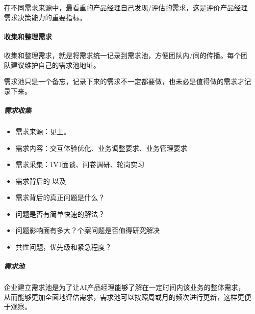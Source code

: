 \documentclass[letterpaper,11pt,english]{sphinxmanual}
\begin{document}
在不同需求来源中，最看重的产品经理自己发现/评估的需求，这是评价产品经理需求决策能力的重要指标。


\paragraph{收集和整理需求}
\label{\detokenize{chapter_knowledge/upgrade_manage:id11}}
收集和整理需求，就是将需求统一记录到需求池，方便团队内/间的传播。每个团队建议维护自己的需求池地址。

需求池只是一个备忘，记录下来的需求不一定都要做，也未必是值得做的需求才记录下来。


\subparagraph{需求收集}
\label{\detokenize{chapter_knowledge/upgrade_manage:id12}}\begin{itemize}
\item {} 
需求来源：见上。

\item {} 
需求内容：交互体验优化、业务调整要求、业务管理要求

\item {} 
需求采集：1V1面谈、问卷调研、轮岗实习

\item {} 
需求背后的  以及 

\item {} 
需求背后的真正问题是什么？

\item {} 
问题是否有简单快速的解法？

\item {} 
问题影响面有多大？个案问题是否值得研究解决

\item {} 
共性问题，优先级和紧急程度？

\end{itemize}


\subparagraph{需求池}
\label{\detokenize{chapter_knowledge/upgrade_manage:id13}}
企业建立需求池是为了让AI产品经理能够了解在一定时间内该业务的整体需求，从而能够更加全面地评估需求，需求池可以按照周或月的频次进行更新，这样更便于观察。
\end{document}

